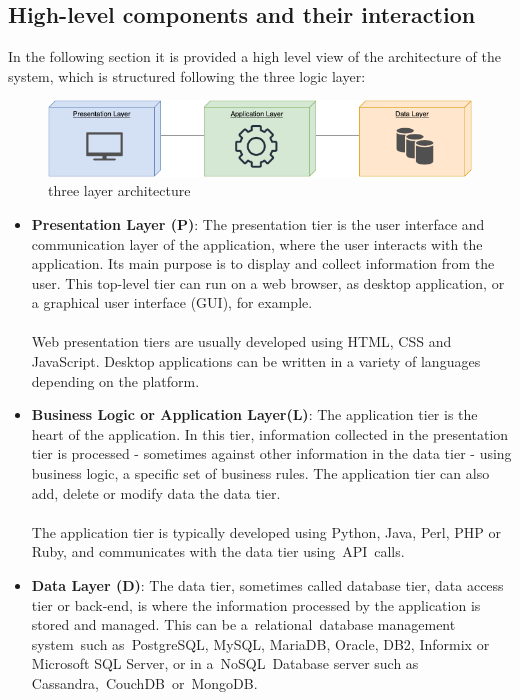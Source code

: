 \subsection{High-level components and their interaction}
In the following section it is provided a high level view of the architecture of the system, 
which is structured following the three logic layer:\\

\begin{figure}[H]
    \begin{center}
    \includegraphics[width=1.2\textwidth]{images/System architecture.png}
    \caption{three layer architecture}
    \label{fig:system architecture}
    \end{center}
\end{figure}

\begin{itemize}
    \item \textbf{Presentation Layer (P)}: The presentation tier is the user interface and communication layer 
    of the application, where the user interacts with the application. Its main purpose is to display  and collect information from the user. This top-level tier can run on a web browser, 
    as desktop application, or a graphical user interface (GUI), for example. \\ \\Web presentation tiers 
    are usually developed using HTML, CSS and JavaScript. Desktop applications can be written in a variety of languages depending on the platform.
    \item \textbf{Business Logic or Application Layer(L)}: The application tier is the heart of the application. 
    In this tier, information collected in the presentation tier is processed - sometimes against other information in the data tier - 
    using business logic, a specific set of business rules. The application tier can also add, delete or modify data the data tier.\\ \\
    The application tier is typically developed using Python, Java, Perl, PHP or Ruby, and communicates with the data tier using API calls. 
    \item \textbf{Data Layer (D)}: The data tier, sometimes called database tier, data access tier or back-end, is where the information 
    processed by the application is stored and managed. This can be a relational database management system such as PostgreSQL, MySQL, MariaDB, 
    Oracle, DB2, Informix or Microsoft SQL Server, or in a NoSQL Database server such as Cassandra, CouchDB or MongoDB. 
\end{itemize}


